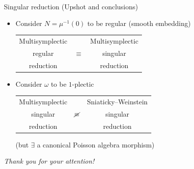\documentclass[handout,10pt]{beamer}
\begin{document}
\begin{frame}{Singular reduction (Upshot and conclusions)}

	\begin{itemize}
		\item Consider $N=\mu^{-1}(0)$ to be regular (smooth embedding)
		\vspace{.5em}
		\begin{table}[]
			\begin{tabular}{ccc}
			Multisymplectic               &                      & Multisymplectic                  \\
			regular                       & $\equiv$             & singular                \\
			reduction & & reduction
			\end{tabular}
		\end{table}	
		
		\pause
		\item
			Consider $\omega$ to be $1$-plectic
			\vspace{.5em}
			\begin{table}[]
				\begin{tabular}{ccc}
				Multisymplectic               &                      &  Sniaticky--Weinstein                  \\
				singular                       & $\cancel\equiv$             & singular                \\
				reduction & & reduction
				\end{tabular}
			\end{table}	

			(but $\exists$ a canonical Poisson algebra morphism)
	\end{itemize}
	
	\pause
			\vfill
		  \centering 
		  {\Huge\color{red} 
		  \emph{Thank you for your attention!}}
			\vfill
\end{frame}
\note[itemize]{
 \item
}
\end{document}
